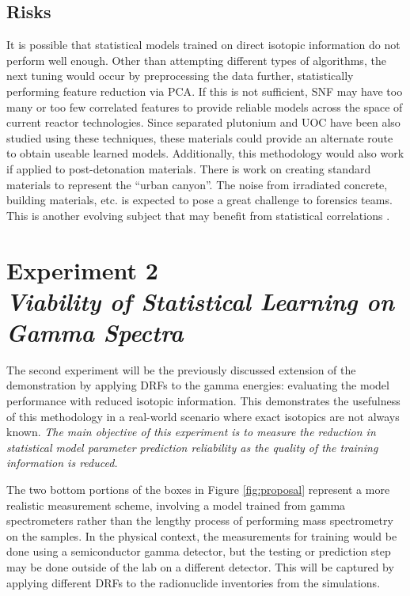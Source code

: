 \subsection*{Risks}

It is possible that statistical models trained on direct isotopic information
do not perform well enough.  Other than attempting different types of
algorithms, the next tuning would occur by preprocessing the data further,
statistically performing feature reduction via \gls{PCA}. If this is not
sufficient, \gls{SNF} may have too many or too few correlated features to
provide reliable models across the space of current reactor technologies. Since
separated plutonium and \gls{UOC} have been also studied using these
techniques, these materials could provide an alternate route to obtain useable
learned models. Additionally, this methodology would also work if applied to
post-detonation materials. There is work on creating standard materials to
represent the ``urban canyon''. The noise from irradiated concrete, building
materials, etc. is expected to pose a great challenge to forensics teams. This
is another evolving subject that may benefit from statistical correlations
\cite{refmaterial}.

\section[Experiment 2: Gamma Spectra]{Experiment 2\\ 
\large{\textit{Viability of Statistical Learning on Gamma Spectra}}}
\label{sec:exp2}

The second experiment will be the previously discussed extension of the
demonstration by applying \glspl{DRF} to the gamma energies: evaluating the
model performance with reduced isotopic information.  This demonstrates the
usefulness of this methodology in a real-world scenario where exact isotopics
are not always known.   \textit{The main objective of this experiment is to
measure the reduction in statistical model parameter prediction reliability as
the quality of the training information is reduced.}

The two bottom portions of the boxes in Figure \ref{fig:proposal} represent a
more realistic measurement scheme, involving a model trained from gamma
spectrometers rather than the lengthy process of performing mass spectrometry
on the samples.  In the physical context, the measurements for training would
be done using a semiconductor gamma detector, but the testing or prediction
step may be done outside of the lab on a different detector.  This will be
captured by applying different \glspl{DRF} to the radionuclide
inventories from the simulations.

